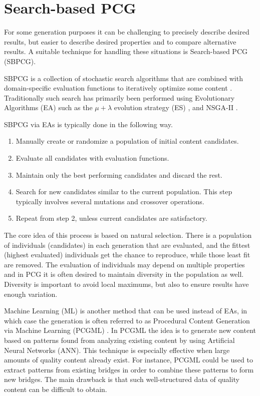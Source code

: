 \section{Search-based PCG}

For some generation purposes it can be challenging to precisely describe desired results, but easier to describe desired properties and to compare alternative results.
A suitable technique for handling these situations is Search-based PCG (SBPCG).

SBPCG is a collection of stochastic search algorithms that are combined with domain-specific evaluation functions to iteratively optimize some content \cite{search_based_pcg} \cite{search_based_pcg2}.
Traditionally such search has primarily been performed using Evolutionary Algorithms (EA) such as the $\mu + \lambda$ evolution strategy (ES) \cite[p.18-20]{pcg_in_games}, and NSGA-II \cite{nsgaii}.

SBPCG via EAs is typically done in the following way.
\vspace{-0.5cm} %
\begin{enumerate}
  \item Manually create or randomize a population of initial content candidates.
  \item Evaluate all candidates with evaluation functions.
  \item Maintain only the best performing candidates and discard the rest.
  \item Search for new candidates similar to the current population. This step typically involves several mutations and crossover operations.
  \item Repeat from step 2, unless current candidates are satisfactory.
\end{enumerate}

The core idea of this process is based on natural selection.
There is a population of individuals (candidates) in each generation that are evaluated, and the fittest (highest evaluated) individuals get the chance to reproduce, while those least fit are removed.
The evaluation of individuals may depend on multiple properties and in PCG it is often desired to maintain diversity in the population as well.
Diversity is important to avoid local maximums, but also to ensure results have enough variation.

Machine Learning (ML) is another method that can be used instead of EAs, in which case the generation is often referred to as Procedural Content Generation via Machine Learning (PCGML) \cite{pcgml} \cite{pcgml2} \cite{pcgml3}.
In PCGML the idea is to generate new content based on patterns found from analyzing existing content by using Artificial Neural Networks (ANN).
This technique is especially effective when large amounts of quality content already exist.
For instance, PCGML could be used to extract patterns from existing bridges in order to combine these patterns to form new bridges.
The main drawback is that such well-structured data of quality content can be difficult to obtain.


